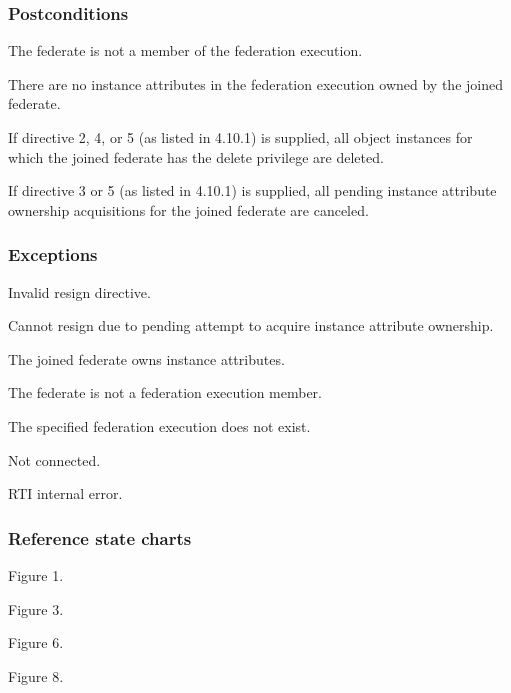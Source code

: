 \subsubsection{Postconditions}

\begin{stdalphalist}
    \item The federate is not a member of the federation execution.
    \item There are no instance attributes in the federation execution owned by the joined federate.
    \item If directive 2, 4, or 5 (as listed in 4.10.1) is supplied, all object instances for which the joined federate has the delete privilege are deleted.
    \item If directive 3 or 5 (as listed in 4.10.1) is supplied, all pending instance attribute ownership acquisitions for the joined federate are canceled.
\end{stdalphalist}

\subsubsection{Exceptions}

\begin{stdalphalist}
    \item Invalid resign directive.
    \item Cannot resign due to pending attempt to acquire instance attribute ownership.
    \item The joined federate owns instance attributes.
    \item The federate is not a federation execution member.
    \item The specified federation execution does not exist.
    \item Not connected.
    \item RTI internal error.
\end{stdalphalist}

\clearpage


\subsubsection{Reference state charts}

\begin{stdalphalist}
    \item Figure 1.
    \item Figure 3.
    \item Figure 6.
    \item Figure 8.
\end{stdalphalist}

